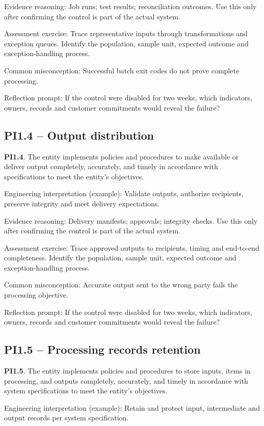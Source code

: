 \documentclass[10pt,oneside]{report}
\begin{document}
Evidence reasoning: Job runs; test results; reconciliation outcomes. Use this only after confirming the control is part of the actual system.

Assessment exercise: Trace representative inputs through transformations and exception queues. Identify the population, sample unit, expected outcome and exception-handling process.

Common misconception: Successful batch exit codes do not prove complete processing.

Reflection prompt: If the control were disabled for two weeks, which indicators, owners, records and customer commitments would reveal the failure?

\subsection{PI1.4 -- Output distribution}
\begin{aicpabox}
\textbf{PI1.4}. The entity implements policies and procedures to make available or deliver output completely, accurately, and timely in accordance with specifications to meet the entity's objectives.\par{}
\end{aicpabox}
Engineering interpretation (example): Validate outputs, authorize recipients, preserve integrity and meet delivery expectations.

Evidence reasoning: Delivery manifests; approvals; integrity checks. Use this only after confirming the control is part of the actual system.

Assessment exercise: Trace approved outputs to recipients, timing and end-to-end completeness. Identify the population, sample unit, expected outcome and exception-handling process.

Common misconception: Accurate output sent to the wrong party fails the processing objective.

Reflection prompt: If the control were disabled for two weeks, which indicators, owners, records and customer commitments would reveal the failure?

\subsection{PI1.5 -- Processing records retention}
\begin{aicpabox}
\textbf{PI1.5}. The entity implements policies and procedures to store inputs, items in processing, and outputs completely, accurately, and timely in accordance with system specifications to meet the entity's objectives.\par{}
\end{aicpabox}
Engineering interpretation (example): Retain and protect input, intermediate and output records per system specification.
\end{document}
